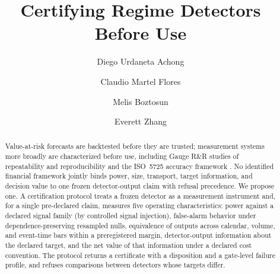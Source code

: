 \documentclass[3p]{elsarticle}
\begin{document}
\begin{frontmatter}

\title{Certifying Regime Detectors Before Use}

\author[m5]{Diego Urdaneta Achong}
\author[m5]{Claudio Martel Flores}
\author[m5]{Melis Boztosun}
\author[m5]{Everett Zhang}
\address[m5]{M5 Research}

\begin{abstract}
Value-at-risk forecasts are backtested before they are trusted; measurement
systems more broadly are characterized before use, including Gauge R\&R
studies of repeatability and reproducibility \citep{NISTGaugeRR} and the
ISO~5725 accuracy framework \citep{ISO5725-1:2023}. No identified financial
framework jointly binds power, size, transport, target information, and
decision value to one frozen detector-output claim with refusal precedence.
We propose one. A certification protocol treats a frozen detector as a
measurement instrument and, for a single pre-declared claim, measures five
operating characteristics: power against a declared signal family (by
controlled signal injection), false-alarm behavior under
dependence-preserving resampled nulls, equivalence of outputs across
calendar, volume, and event-time bars within a preregistered margin,
detector-output information about the declared target, and the net value of
that information under a declared cost convention. The protocol returns a
certificate with a disposition and a gate-level failure profile, and refuses
comparisons between detectors whose targets differ.


\end{abstract}
\end{frontmatter}
\end{document}
